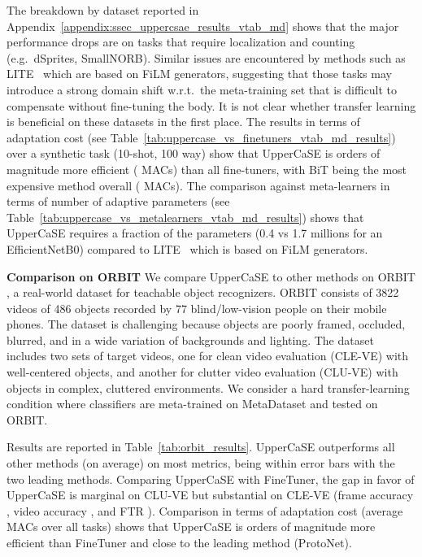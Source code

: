 \documentclass{article}
\begin{document}
The breakdown by dataset reported in Appendix~\ref{appendix:ssec_uppercsae_results_vtab_md} shows that the major performance drops are on tasks that require localization and counting (e.g.~dSprites, SmallNORB). Similar issues are encountered by methods such as LITE~\citep{bronskill2021memory} which are based on FiLM generators, suggesting that those tasks may introduce a strong domain shift w.r.t.~the meta-training set that is difficult to compensate without fine-tuning the body. It is not clear whether transfer learning is beneficial on these datasets in the first place. The results in terms of adaptation cost (see Table~\ref{tab:uppercase_vs_finetuners_vtab_md_results}) over a synthetic task (10-shot, 100 way) show that UpperCaSE is orders of magnitude more efficient ( MACs) than all fine-tuners, with BiT being the most expensive method overall ( MACs). The comparison against meta-learners in terms of number of adaptive parameters (see Table~\ref{tab:uppercase_vs_metalearners_vtab_md_results}) shows that UpperCaSE requires a fraction of the parameters (0.4 vs 1.7 millions for an EfficientNetB0) compared to LITE~\citep{bronskill2021memory} which is based on FiLM generators.


\textbf{Comparison on ORBIT} We compare UpperCaSE to other methods on ORBIT \citep{massiceti2021orbit}, a real-world dataset for teachable object recognizers. ORBIT consists of 3822 videos of 486 objects recorded by 77 blind/low-vision people on their mobile phones. The dataset is challenging because objects are poorly framed, occluded, blurred, and in a wide variation of backgrounds and lighting. The dataset includes two sets of target videos, one for clean video evaluation (CLE-VE) with well-centered objects, and another for clutter video evaluation (CLU-VE) with objects in complex, cluttered environments. We consider a hard transfer-learning condition where classifiers are meta-trained on MetaDataset and tested on ORBIT. 

Results are reported in Table~\ref{tab:orbit_results}. UpperCaSE outperforms all other methods (on average) on most metrics, being within error bars with the two leading methods. Comparing UpperCaSE with FineTuner, the gap in favor of UpperCaSE is marginal on CLU-VE but substantial on CLE-VE (frame accuracy , video accuracy , and FTR ). Comparison in terms of adaptation cost (average MACs over all tasks) shows that UpperCaSE is orders of magnitude more efficient than FineTuner and close to the leading method (ProtoNet).
\end{document}
